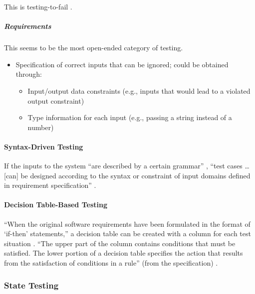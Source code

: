 This is testing-to-fail \citep[p.~77]{Patton2006}.

\subparagraph{Requirements}
This seems to be the most open-ended category of testing.
\begin{itemize}
      \item Specification of correct inputs that can be ignored;
            could be obtained through:
            \begin{itemize}
                  \item Input/output data constraints (e.g., inputs that would
                        lead to a violated output constraint)
                  \item Type information for each input (e.g., passing a string
                        instead of a number)
            \end{itemize}
\end{itemize}

\paragraph{Syntax-Driven Testing \citep[pp.~448-449]{PetersAndPedrycz2000}}

If the inputs to the system ``are described by a certain grammar''
\citep[p.~448]{PetersAndPedrycz2000}, ``test cases \dots [can] be designed
according to the syntax or constraint of input domains defined in requirement
specification'' \citep[p.~260]{IntanaEtAl2020}
.

\paragraph{Decision Table-Based Testing \citep[pp.~448, 450-453]{PetersAndPedrycz2000}}

``When the original software requirements have been formulated in the format of
`if-then' statements,'' a decision table can be created with a column for each
test situation \citep[p.~448]{PetersAndPedrycz2000}. ``The upper part of the
column contains conditions that must be satisfied. The lower portion of a
decision table specifies the action that results from the satisfaction of
conditions in a rule'' (from the specification) \citep[p.~450]{PetersAndPedrycz2000}.

\subsubsection{State Testing \citep[pp.~79-87]{Patton2006}}

